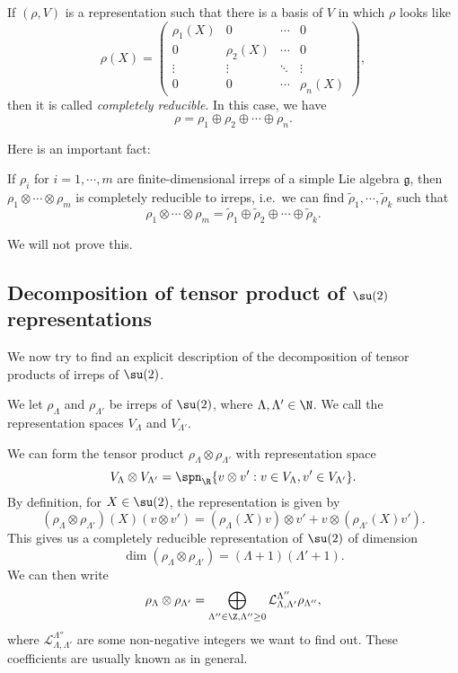 \documentclass[a4paper]{article}
\begin{document}
\begin{defi}
  If $(\rho, V)$ is a representation such that there is a basis of $V$ in which $\rho$ looks like
  \[
    \rho(X) =
    \begin{pmatrix}
      \rho_1(X) & 0 & \cdots & 0\\
      0 & \rho_2(X) & \cdots & 0\\
      \vdots & \vdots & \ddots & \vdots\\
      0 & 0 & \cdots & \rho_n(X)
    \end{pmatrix},
  \]
  then it is called \emph{completely reducible}. In this case, we have
  \[
    \rho = \rho_1 \oplus \rho_2 \oplus \cdots \oplus \rho_n.
  \]
\end{defi}

Here is an important fact:
\begin{thm}
  If $\rho_i$ for $i = 1,\cdots, m$ are finite-dimensional irreps of a simple Lie algebra $\mathfrak{g}$, then $\rho_1 \otimes \cdots \otimes \rho_m$ is completely reducible to irreps, i.e.\ we can find $\tilde{\rho}_1, \cdots, \tilde{\rho}_k$ such that
  \[
    \rho_1 \otimes \cdots \otimes \rho_m = \tilde{\rho}_1 \oplus \tilde{\rho}_2 \oplus \cdots \oplus \tilde{\rho}_k.
  \]
\end{thm}
We will not prove this.
\subsection{Decomposition of tensor product of \texorpdfstring{$\su(2)$}{su(2)} representations}
We now try to find an explicit description of the decomposition of tensor products of irreps of $\su(2)$.

We let $\rho_\Lambda$ and $\rho_{\Lambda'}$ be irreps of $\su(2)$, where $\Lambda, \Lambda' \in \N$. We call the representation spaces $V_\Lambda$ and $V_{\Lambda'}$.

We can form the tensor product $\rho_\Lambda \otimes \rho_{\Lambda'}$ with representation space
\[
  V_\Lambda \otimes V_{\Lambda'} = \spn_\R \{v \otimes v': v \in V_\Lambda, v' \in V_{\Lambda'}\}.
\]
By definition, for $X \in \su(2)$, the representation is given by
\[
  (\rho_\Lambda \otimes \rho_{\Lambda'})(X)(v \otimes v') = (\rho_\Lambda(X)v) \otimes v' + v \otimes (\rho_{\Lambda'}(X)v').
\]
This gives us a completely reducible representation of $\su(2)$ of dimension
\[
  \dim (\rho_\Lambda \otimes \rho_{\Lambda'}) = (\Lambda + 1)(\Lambda' + 1).
\]
We can then write
\[
  \rho_\Lambda \otimes \rho_{\Lambda'} = \bigoplus_{\Lambda'' \in \Z, \Lambda'' \geq 0} \mathcal{L}^{\Lambda''}_{\Lambda, \Lambda'} \rho_{\Lambda''},
\]
where $\mathcal{L}^{\Lambda''}_{\Lambda, \Lambda'}$ are some non-negative integers we want to find out. These coefficients are usually known as  in general.
\end{document}
